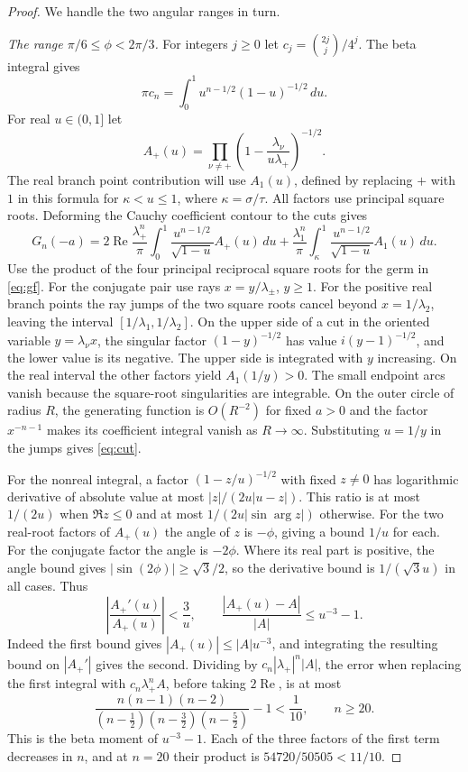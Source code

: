 \documentclass[11pt]{article}
\begin{document}
\begin{proof}
We handle the two angular ranges in turn.

\medskip
\noindent\textit{The range \(\pi/6\le\phi<2\pi/3\).}
For integers $j\geq0$ let $c_j=\binom{2j}{j}/4^j$. The beta integral gives
\[
\pi c_n=\int_0^1 u^{n-1/2}(1-u)^{-1/2}\,du.
\]
For real $u\in(0,1]$ let
\[
A_+(u)=\prod_{\nu\ne+}\left(1-\frac{\lambda_\nu}{u\lambda_+}\right)^{-1/2}.
\]
The real branch point contribution will use $A_1(u)$, defined by replacing $+$ with $1$ in this formula for $\kappa<u\leq1$, where $\kappa=\sigma/\tau$. All factors use principal square roots. Deforming the Cauchy coefficient contour to the cuts gives
\begin{equation}
G_n(-a)=
  2\operatorname{Re}\frac{\lambda_+^n}{\pi}
       \int_0^1\frac{u^{n-1/2}}{\sqrt{1-u}} A_+(u)\,du
 +\frac{\lambda_1^n}{\pi}
       \int_\kappa^1\frac{u^{n-1/2}}{\sqrt{1-u}} A_1(u)\,du .
\label{eq:cut}
\end{equation}
Use the product of the four principal reciprocal square roots for the germ in \eqref{eq:gf}. For the conjugate pair use rays $x=y/\lambda_\pm$, $y\geq1$. For the positive real branch points the ray jumps of the two square roots cancel beyond $x=1/\lambda_2$, leaving the interval $[1/\lambda_1,1/\lambda_2]$. On the upper side of a cut in the oriented variable $y=\lambda_\nu x$, the singular factor $(1-y)^{-1/2}$ has value $i(y-1)^{-1/2}$, and the lower value is its negative. The upper side is integrated with $y$ increasing. On the real interval the other factors yield $A_1(1/y)>0$. The small endpoint arcs vanish because the square-root singularities are integrable. On the outer circle of radius $R$, the generating function is $O(R^{-2})$ for fixed $a>0$ and the factor $x^{-n-1}$ makes its coefficient integral vanish as $R\to\infty$. Substituting $u=1/y$ in the jumps gives \eqref{eq:cut}.

For the nonreal integral, a factor $(1-z/u)^{-1/2}$ with fixed $z\ne0$ has logarithmic derivative of absolute value at most $|z|/(2u|u-z|)$. This ratio is at most $1/(2u)$ when $\Re z\leq0$ and at most $1/(2u|\sin\arg z|)$ otherwise. For the two real-root factors of $A_+(u)$ the angle of $z$ is $-\phi$, giving a bound $1/u$ for each. For the conjugate factor the angle is $-2\phi$. Where its real part is positive, the angle bound gives $|\sin(2\phi)|\geq\sqrt3/2$, so the derivative bound is $1/(\sqrt3 u)$ in all cases. Thus
\begin{equation}
\left|\frac{A_+'(u)}{A_+(u)}\right|<\frac3u,\qquad
\frac{|A_+(u)-A|}{|A|}\leq u^{-3}-1.
\label{eq:amp}
\end{equation}
Indeed the first bound gives $|A_+(u)|\leq |A|u^{-3}$, and integrating the resulting bound on $|A_+'|$ gives the second. Dividing by $c_n|\lambda_+|^n|A|$, the error when replacing the first integral with $c_n \lambda_+^n A$, before taking $2\operatorname{Re}$, is at most
\begin{equation}
\frac{n(n-1)(n-2)}{(n-\frac12)(n-\frac32)(n-\frac52)}-1<\frac1{10},
\qquad n\geq20.
\label{eq:beta}
\end{equation}
This is the beta moment of $u^{-3}-1$. Each of the three factors of the first term decreases in $n$, and at $n=20$ their product is $54720/50505<11/10$.


\end{proof}
\end{document}

